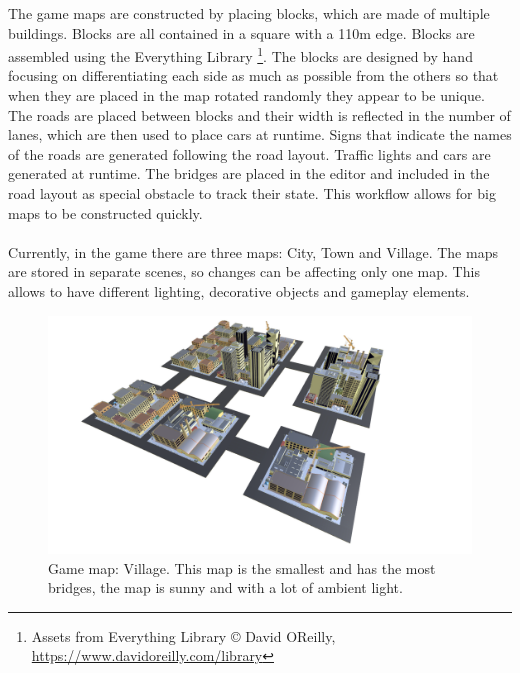\documentclass[12pt]{article}
\begin{document}
The game maps are constructed by placing blocks, which are made of multiple buildings. Blocks are all contained in a square with a 110m edge. Blocks are assembled using the Everything Library \footnote{Assets from Everything Library © David OReilly, \url{https://www.davidoreilly.com/library}}. The blocks are designed by hand focusing on differentiating each side as much as possible from the others so that when they are placed in the map rotated randomly they appear to be unique. The roads are placed between blocks and their width is reflected in the number of lanes, which are then used to place cars at runtime. Signs that indicate the names of the roads are generated following the road layout. Traffic lights and cars are generated at runtime. The bridges are placed in the editor and included in the road layout as special obstacle to track their state. This workflow allows for big maps to be constructed quickly. \\
\\
Currently, in the game there are three maps: City, Town and Village. The maps are stored in separate scenes, so changes can be affecting only one map. This allows to have different lighting, decorative objects and gameplay elements. 

\begin{figure}[H]
\includegraphics[width=\textwidth]{map_village}
\caption{Game map: Village. This map is the smallest and has the most bridges, the map is sunny and with a lot of ambient light.}
\end{figure}
\end{document}
